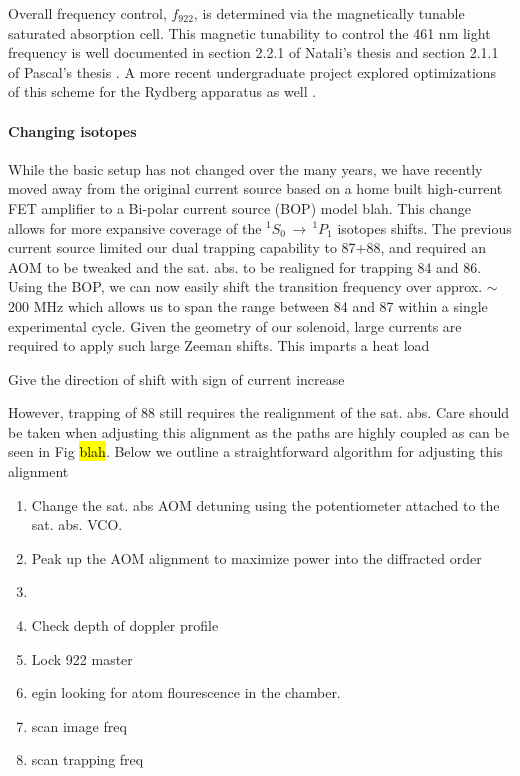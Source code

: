 Overall frequency control, $f_{922}$, is determined via the magnetically tunable saturated absorption cell.
This magnetic tunability to control the 461 nm light frequency is well documented in section 2.2.1 of Natali's thesis \cite{MartinezdeEscolar2010} and section 2.1.1 of Pascal's thesis \cite{Mickelson2010b}.
A more recent undergraduate project explored optimizations of this scheme for the Rydberg apparatus as well \cite{MichaelViray2014}.

\paragraph{Changing isotopes} \label{para:change_iso}
While the basic setup has not changed over the many years, we have recently moved away from the original current source based on a home built high-current FET amplifier to a Bi-polar current source (BOP) model blah. 
This change allows for more expansive coverage of the $^1S_0\,\rightarrow\,^1P_1$ isotopes shifts. The previous current source limited our dual trapping capability to 87+88, and required an AOM to be tweaked and the sat. abs. to be realigned for trapping 84 and 86. 
Using the BOP, we can now easily shift the transition frequency over approx. $\sim$200 MHz which allows us to span the range between 84 and 87 within a single experimental cycle.
Given the geometry of our solenoid, large currents are required to apply such large Zeeman shifts.
This imparts a heat load 

Give the direction of shift with sign of current increase
 
However, trapping of 88 still requires the realignment of the sat. abs. 
Care should be taken when adjusting this alignment as the paths are highly coupled as can be seen in Fig \hl{blah}. 
Below we outline a straightforward algorithm for adjusting this alignment

\begin{enumerate}
\item Change the sat. abs AOM detuning using the potentiometer attached to the sat. abs. VCO. 
\item Peak up the AOM alignment to maximize power into the diffracted order
\item
\item Check depth of doppler profile
\item Lock 922 master
\item egin looking for atom flourescence in the chamber.
\item scan image freq
\item scan trapping freq

\end{enumerate}




